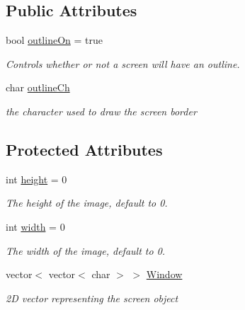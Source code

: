 \subsection*{Public Attributes}
\begin{DoxyCompactItemize}
\item 
\hypertarget{classScreen_a6f906b745f406576d9f7aeaec330c9d6}{bool \hyperlink{classScreen_a6f906b745f406576d9f7aeaec330c9d6}{outline\-On} = true}\label{classScreen_a6f906b745f406576d9f7aeaec330c9d6}

\begin{DoxyCompactList}\small\item\em Controls whether or not a screen will have an outline. \end{DoxyCompactList}\item 
\hypertarget{classScreen_a0b59df2bfafff7a121286a5ea40503b6}{char \hyperlink{classScreen_a0b59df2bfafff7a121286a5ea40503b6}{outline\-Ch}}\label{classScreen_a0b59df2bfafff7a121286a5ea40503b6}

\begin{DoxyCompactList}\small\item\em the character used to draw the screen border \end{DoxyCompactList}\end{DoxyCompactItemize}
\subsection*{Protected Attributes}
\begin{DoxyCompactItemize}
\item 
\hypertarget{classScreen_a55405920693276db8fbdbf3a903b8d2f}{int \hyperlink{classScreen_a55405920693276db8fbdbf3a903b8d2f}{height} = 0}\label{classScreen_a55405920693276db8fbdbf3a903b8d2f}

\begin{DoxyCompactList}\small\item\em The height of the image, default to 0. \end{DoxyCompactList}\item 
\hypertarget{classScreen_a49be8f8ccf7ed7a3151a761495c0ce21}{int \hyperlink{classScreen_a49be8f8ccf7ed7a3151a761495c0ce21}{width} = 0}\label{classScreen_a49be8f8ccf7ed7a3151a761495c0ce21}

\begin{DoxyCompactList}\small\item\em The width of the image, default to 0. \end{DoxyCompactList}\item 
\hypertarget{classScreen_aa91047854045bd18158557ea4b0c596f}{vector$<$ vector$<$ char $>$ $>$ \hyperlink{classScreen_aa91047854045bd18158557ea4b0c596f}{Window}}\label{classScreen_aa91047854045bd18158557ea4b0c596f}

\begin{DoxyCompactList}\small\item\em 2\-D vector representing the screen object \end{DoxyCompactList}\end{DoxyCompactItemize}

